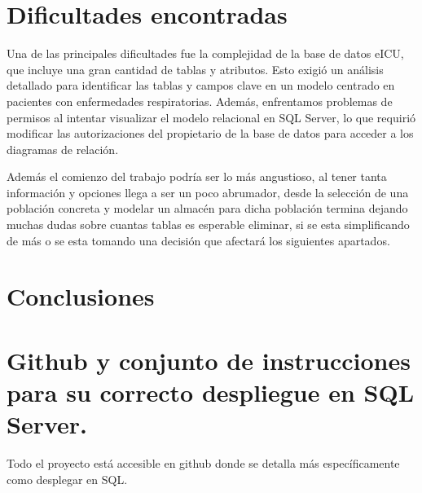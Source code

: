 \documentclass[12pt, a4paper, twoside]{article}
\begin{document}
	\section{Dificultades encontradas}
	
	
	Una de las principales dificultades fue la complejidad de la base de datos eICU, que incluye una gran cantidad de tablas y atributos. Esto exigió un análisis detallado para identificar las tablas y campos clave en un modelo centrado en pacientes con enfermedades respiratorias. Además, enfrentamos problemas de permisos al intentar visualizar el modelo relacional en SQL Server, lo que requirió modificar las autorizaciones del propietario de la base de datos para acceder a los diagramas de relación.
	
	Además el comienzo del trabajo podría ser lo más angustioso, al tener tanta información y opciones llega a ser un poco abrumador, desde la selección de una población concreta y modelar un almacén para dicha población termina dejando muchas dudas sobre cuantas tablas es esperable eliminar, si se esta simplificando de más o se esta tomando una decisión que afectará los siguientes apartados. 
	
	\section{Conclusiones}
	
	


	\section{Github y conjunto de instrucciones para su correcto despliegue en SQL Server.}

	Todo el proyecto está accesible en github \cite{depab2024} donde se detalla más específicamente como desplegar en SQL.
	\printbibliography
	
	
	
	
\end{document}
